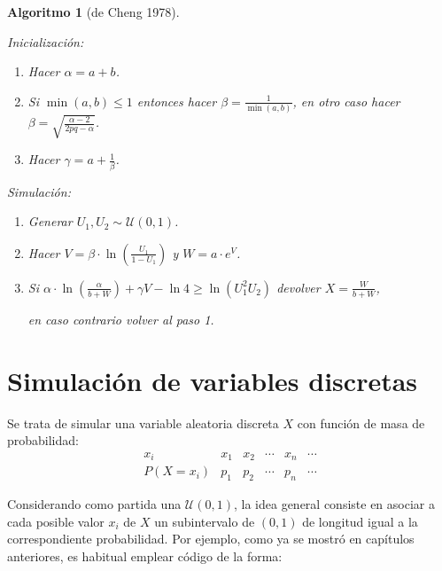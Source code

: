 \documentclass[
]{book}
\theoremstyle{break}
\newtheorem{conjecture}{Algoritmo}[chapter]
\theoremstyle{nonumberplain}
\begin{document}
\begin{conjecture}[de Cheng 1978]
\protect\hypertarget{cnj:cheng}{}\label{cnj:cheng}

Inicialización:

\begin{enumerate}
\def\labelenumi{\arabic{enumi}.}
\item
  Hacer \(\alpha = a + b\).
\item
  Si \(\min(a,b) \leq1\) entonces hacer \(\beta=\frac1{\min( a,b)}\), en otro caso hacer \(\beta=\sqrt{\frac{\alpha-2}{2pq-\alpha}}\).
\item
  Hacer \(\gamma=a+\frac1\beta\).
\end{enumerate}

Simulación:

\begin{enumerate}
\def\labelenumi{\arabic{enumi}.}
\item
  Generar \(U_1, U_2\sim \mathcal{U}(0, 1)\).
\item
  Hacer \(V=\beta\cdot\ln\left( \frac{U_1}{1-U_1}\right)\) y \(W=a\cdot e^{V}\).
\item
  Si \(\alpha\cdot\ln\left( \frac\alpha{b+W}\right) +\gamma V-\ln4 \ge \ln\left( U_1^{2}U_2\right)\) devolver \(X=\frac W{b+W}\),

  en caso contrario volver al paso 1.
\end{enumerate}

\end{conjecture}

\hypertarget{discretas}{%
\chapter{Simulación de variables discretas}\label{discretas}}

Se trata de simular una variable aleatoria discreta \(X\) con función de masa de
probabilidad:
\[\begin{array}{l|ccccc}
 x_{i}  &  x_{1}  &  x_{2}  &  \cdots   &  x_{n}  &  \cdots   \\ \hline
 P\left( X=x_{i}\right)   &  p_{1}  &  p_{2}  &  \cdots   &  p_{n}  &  
\cdots  
\end{array}\]

Considerando como partida una \(\mathcal{U}\left( 0,1\right)\), la
idea general consiste en asociar a cada posible valor \(x_{i}\) de \(X\)
un subintervalo de \(\left( 0,1\right)\) de longitud igual a la correspondiente
probabilidad.
Por ejemplo, como ya se mostró en capítulos anteriores, es habitual emplear
código de la forma:
\end{document}
